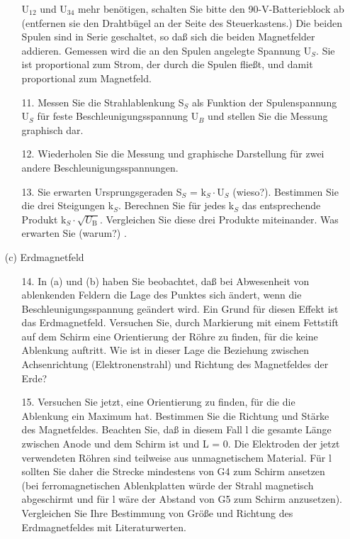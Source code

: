 \documentclass[12pt]{scrartcl}
\begin{document}
\begin{itemize}
\begin{enumerate}
U$_{12}$ und U$_{34}$ mehr benötigen, schalten Sie bitte den 90-V-Batterieblock ab (entfernen sie den Drahtbügel
an der Seite des Steuerkastens.) Die beiden Spulen sind in Serie geschaltet, so daß sich die beiden Magnetfelder addieren. Gemessen wird die an den Spulen angelegte Spannung U$_S$. Sie ist proportional zum Strom, der durch die Spulen fließt, und damit proportional zum Magnetfeld.
\item[11.]
Messen Sie die Strahlablenkung S$_S$ als Funktion der Spulenspannung U$_S$ für feste
Beschleunigungsspannung U$_B$
und stellen Sie die Messung graphisch dar.
\item[12.]
Wiederholen Sie die Messung und graphische Darstellung für zwei andere Beschleunigungsspannungen.
\item[13.]
Sie erwarten Ursprungsgeraden S$_S$ = k$_S\cdot$U$_S$ (wieso?). Bestimmen Sie die drei Steigungen k$_S$. Berechnen Sie für jedes k$_S$
das entsprechende Produkt k$_S\cdot\sqrt{U_\text{B}}$. Vergleichen Sie
diese drei Produkte miteinander. Was erwarten Sie (warum?)
.
\end{enumerate}
\item[(c)] Erdmagnetfeld
\newline
\begin{enumerate}
\item[14.]
In (a) und (b) haben Sie beobachtet, daß bei Abwesenheit von ablenkenden Feldern die Lage des Punktes sich ändert, wenn die Beschleunigungsspannung geändert wird. Ein Grund für diesen Effekt ist das Erdmagnetfeld. Versuchen Sie, durch Markierung mit einem Fettstift auf dem Schirm eine Orientierung der Röhre zu finden, für die keine Ablenkung auftritt. Wie ist in dieser Lage die Beziehung zwischen Achsenrichtung (Elektronenstrahl) und Richtung des Magnetfeldes der Erde?
\item[15.]
Versuchen Sie jetzt, eine Orientierung zu finden, für die die Ablenkung ein Maximum hat. Bestimmen Sie die Richtung und Stärke des Magnetfeldes. Beachten Sie, daß in diesem Fall l die gesamte Länge zwischen Anode und dem Schirm ist und L = 0. Die Elektroden der jetzt verwendeten Röhren sind teilweise aus unmagnetischem Material. Für l
sollten Sie daher die Strecke mindestens von G4 zum Schirm
ansetzen (bei ferromagnetischen Ablenkplatten würde der Strahl magnetisch abgeschirmt und für l wäre der Abstand von G5 zum Schirm anzusetzen). Vergleichen Sie Ihre Bestimmung von Größe und Richtung des Erdmagnetfeldes mit Literaturwerten.
\end{enumerate}

\end{itemize}
\end{document}
